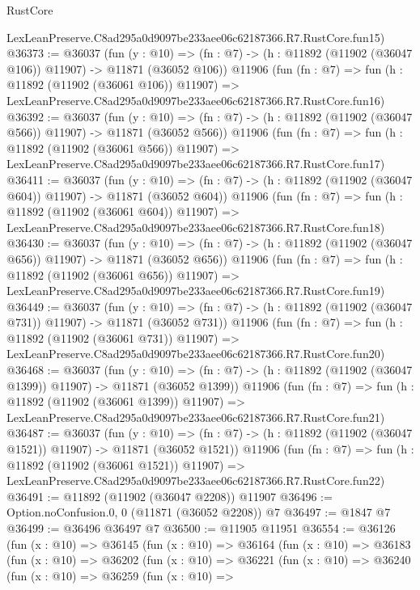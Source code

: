 \begin{lexlean}{RustCore}
\begin{coremodule}
    LexLeanPreserve.C8ad295a0d9097be233aee06c62187366.R7.RustCore.fun15)
@36373 := @36037
    (fun (y : @10) =>
    (fn : @7) -> (h : @11892 (@11902 (@36047 @106)) @11907) -> @11871 (@36052 @106))
    @11906
    (fun (fn : @7) =>
    fun (h : @11892 (@11902 (@36061 @106)) @11907) =>
    LexLeanPreserve.C8ad295a0d9097be233aee06c62187366.R7.RustCore.fun16)
@36392 := @36037
    (fun (y : @10) =>
    (fn : @7) -> (h : @11892 (@11902 (@36047 @566)) @11907) -> @11871 (@36052 @566))
    @11906
    (fun (fn : @7) =>
    fun (h : @11892 (@11902 (@36061 @566)) @11907) =>
    LexLeanPreserve.C8ad295a0d9097be233aee06c62187366.R7.RustCore.fun17)
@36411 := @36037
    (fun (y : @10) =>
    (fn : @7) -> (h : @11892 (@11902 (@36047 @604)) @11907) -> @11871 (@36052 @604))
    @11906
    (fun (fn : @7) =>
    fun (h : @11892 (@11902 (@36061 @604)) @11907) =>
    LexLeanPreserve.C8ad295a0d9097be233aee06c62187366.R7.RustCore.fun18)
@36430 := @36037
    (fun (y : @10) =>
    (fn : @7) -> (h : @11892 (@11902 (@36047 @656)) @11907) -> @11871 (@36052 @656))
    @11906
    (fun (fn : @7) =>
    fun (h : @11892 (@11902 (@36061 @656)) @11907) =>
    LexLeanPreserve.C8ad295a0d9097be233aee06c62187366.R7.RustCore.fun19)
@36449 := @36037
    (fun (y : @10) =>
    (fn : @7) -> (h : @11892 (@11902 (@36047 @731)) @11907) -> @11871 (@36052 @731))
    @11906
    (fun (fn : @7) =>
    fun (h : @11892 (@11902 (@36061 @731)) @11907) =>
    LexLeanPreserve.C8ad295a0d9097be233aee06c62187366.R7.RustCore.fun20)
@36468 := @36037
    (fun (y : @10) =>
    (fn : @7) -> (h : @11892 (@11902 (@36047 @1399)) @11907) -> @11871 (@36052 @1399))
    @11906
    (fun (fn : @7) =>
    fun (h : @11892 (@11902 (@36061 @1399)) @11907) =>
    LexLeanPreserve.C8ad295a0d9097be233aee06c62187366.R7.RustCore.fun21)
@36487 := @36037
    (fun (y : @10) =>
    (fn : @7) -> (h : @11892 (@11902 (@36047 @1521)) @11907) -> @11871 (@36052 @1521))
    @11906
    (fun (fn : @7) =>
    fun (h : @11892 (@11902 (@36061 @1521)) @11907) =>
    LexLeanPreserve.C8ad295a0d9097be233aee06c62187366.R7.RustCore.fun22)
@36491 := @11892 (@11902 (@36047 @2208)) @11907
@36496 := Option.noConfusion.{0, 0} (@11871 (@36052 @2208)) @7
@36497 := @1847 @7
@36499 := @36496 @36497 @7
@36500 := @11905 @11951
@36554 := @36126
    (fun (x : @10) =>
    @36145
      (fun (x : @10) =>
      @36164
        (fun (x : @10) =>
        @36183
          (fun (x : @10) =>
          @36202
            (fun (x : @10) =>
            @36221
              (fun (x : @10) =>
              @36240
                (fun (x : @10) =>
                @36259
                  (fun (x : @10) =>

\end{coremodule}
\end{lexlean}

